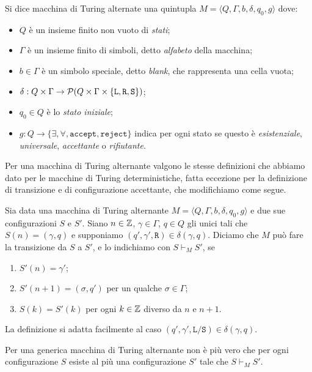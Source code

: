 \begin{definizione}
\label{def:alt-TM}
 Si dice macchina di Turing alternate una quintupla
 $M=\langle Q, \Gamma, b, \delta, q_0, g \rangle$ dove:
 \begin{itemize}
  \item $Q$ è un insieme finito non vuoto di \emph{stati};
  \item $\Gamma$ è un insieme finito di simboli, detto \emph{alfabeto} della macchina;
  \item $b \in \Gamma$ è un simbolo speciale, detto \emph{blank}, che rappresenta
  una cella vuota;
  \item $\delta: Q \times \Gamma \to \mathcal{P}(Q \times \Gamma \times \{\texttt{L},\texttt{R},\texttt{S}\})$;
  \item $q_0 \in Q$ è lo \emph{stato iniziale};
  \item $g: Q \to \{\exists, \forall, \texttt{accept}, \texttt{reject}\}$
  indica per ogni stato se questo è \emph{esistenziale}, \emph{universale},
  \emph{accettante} o \emph{rifiutante}.
 \end{itemize}
\end{definizione}

Per una macchina di Turing alternante valgono le stesse definizioni che
abbiamo dato per le macchine di Turing deterministiche, 
fatta eccezione per la definizione di transizione e di configurazione accettante, che
modifichiamo come segue.
\begin{definizione}
 Sia data una macchina di Turing alternante $M=\langle Q, \Gamma, b, \delta, q_0, g \rangle$
 e due sue configurazioni $S$ e $S'$.
 Siano $n \in \mathbb{Z}$, $\gamma \in \Gamma$, $q \in Q$ gli unici tali che
 $S(n) = (\gamma, q)$ e supponiamo $(q', \gamma', \texttt{R}) \in \delta(\gamma, q)$.
 Diciamo che  $M$ può fare la transizione da $S$ a $S'$, e lo indichiamo con
 $S \vdash_M S'$, se 
 \begin{enumerate}
  \item $S'(n)=\gamma'$;
  \item $S'(n+1)=(\sigma, q')$ per un
 qualche $\sigma \in \Gamma$;
  \item $S(k) = S'(k)$ per ogni $k \in \mathbb{Z}$ diverso da
 $n$ e $n+1$.
 \end{enumerate}
 La definizione si adatta facilmente al caso
 $(q', \gamma', \texttt{L}/\texttt{S}) \in \delta(\gamma, q)$.
\end{definizione}

\begin{osservazione}
 Per una generica macchina di Turing alternante non è più vero che per ogni
 configurazione $S$ esiste al più una configurazione $S'$ tale che $S \vdash_M S'$.
\end{osservazione}

